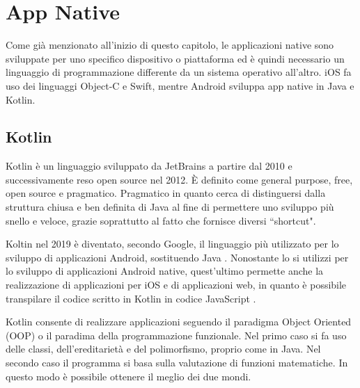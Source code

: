 \section{App Native}

Come gi\`a menzionato all'inizio di questo capitolo, le applicazioni native sono sviluppate per uno specifico dispositivo o piattaforma ed \`e quindi necessario un linguaggio di programmazione differente da un sistema operativo all'altro.
iOS fa uso dei linguaggi Object-C e Swift, mentre Android sviluppa app native in Java e Kotlin.
\subsection{Kotlin}

Kotlin \`e un linguaggio sviluppato da JetBrains a partire dal 2010 e successivamente reso open source nel 2012. \`E definito come general purpose, free, open source e pragmatico. Pragmatico in quanto cerca di distinguersi dalla struttura chiusa e ben
definita di Java al fine di permettere uno sviluppo pi\`u snello e veloce, grazie soprattutto al fatto che fornisce diversi ``shortcut".

Koltin nel 2019 \`e diventato, secondo Google, il linguaggio pi\`u utilizzato per lo sviluppo di applicazioni Android, sostituendo Java \cite{KotlinTech}.
Nonostante lo si utilizzi per lo sviluppo di applicazioni Android native, quest'ultimo permette anche la realizzazione di applicazioni per iOS e di applicazioni web, in quanto \`e possibile transpilare il codice scritto in Kotlin
in codice JavaScript \cite{Kotlin:JetBrains}.

Kotlin consente di realizzare applicazioni seguendo il paradigma Object Oriented {}(OOP) o il paradima della programmazione funzionale. Nel primo caso si fa uso delle classi, dell'ereditariet\`a e del polimorfismo, proprio come in Java.
Nel secondo caso il programma si basa sulla valutazione di funzioni matematiche. In questo modo \`e possibile ottenere il meglio dei due mondi\cite{KotlinInfoWorld}.

